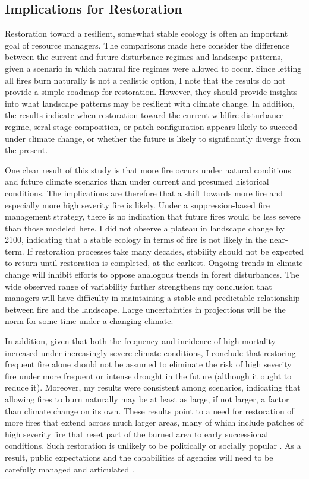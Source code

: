 \subsection*{Implications for Restoration}

Restoration toward a resilient, somewhat stable ecology is often an important goal of resource managers. The comparisons made here consider the difference between the current and future disturbance regimes and landscape patterns, given a scenario in which natural fire regimes were allowed to occur. Since letting all fires burn naturally is not a realistic option, I note that the results do not provide a simple roadmap for restoration. However, they should provide insights into what landscape patterns may be resilient with climate change. In addition, the results indicate when restoration toward the current wildfire disturbance regime, seral stage composition, or patch configuration appears likely to succeed under climate change, or whether the future is likely to significantly diverge from the present. 

One clear result of this study is that more fire occurs under natural conditions and future climate scenarios than under current and presumed historical conditions. The implications are therefore that a shift towards more fire and especially more high severity fire is likely. Under a suppression-based fire management strategy, there is no indication that future fires would be less severe than those modeled here. I did not observe a plateau in landscape change by 2100, indicating that a stable ecology in terms of fire is not likely in the near-term. If restoration processes take many decades, stability should not be expected to return until restoration is completed, at the earliest. Ongoing trends in climate change will inhibit efforts to oppose analogous trends in forest disturbances. The wide observed range of variability further strengthens my conclusion that managers will have difficulty in maintaining a stable and predictable relationship between fire and the landscape. Large uncertainties in projections will be the norm for some time under a changing climate. 

In addition, given that both the frequency and incidence of high mortality increased under increasingly severe climate conditions, I conclude that restoring frequent fire alone should not be assumed to eliminate the risk of high severity fire under more frequent or intense drought in the future (although it ought to reduce it). Moreover, my results were consistent among scenarios, indicating that allowing fires to burn naturally may be at least as large, if not larger, a factor than climate change on its own. These results point to a need for restoration of more fires that extend across much larger areas, many of which include patches of high severity fire that reset part of the burned area to early successional conditions. Such restoration is unlikely to be politically or socially popular \citep{Stephens2010,Stephens2013}. As a result, public expectations and the capabilities of agencies will need to be carefully managed and articulated \citep{Keeley2000}. 


